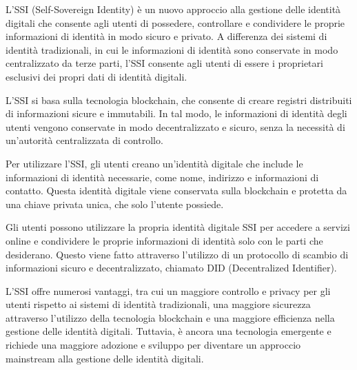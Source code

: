 L'SSI (Self-Sovereign Identity) è un nuovo approccio alla gestione delle identità digitali che consente agli utenti di possedere, controllare e condividere le proprie informazioni di identità in modo sicuro e privato. A differenza dei sistemi di identità tradizionali, in cui le informazioni di identità sono conservate in modo centralizzato da terze parti, l'SSI consente agli utenti di essere i proprietari esclusivi dei propri dati di identità digitali.

L'SSI si basa sulla tecnologia blockchain, che consente di creare registri distribuiti di informazioni sicure e immutabili. In tal modo, le informazioni di identità degli utenti vengono conservate in modo decentralizzato e sicuro, senza la necessità di un'autorità centralizzata di controllo.

Per utilizzare l'SSI, gli utenti creano un'identità digitale che include le informazioni di identità necessarie, come nome, indirizzo e informazioni di contatto. Questa identità digitale viene conservata sulla blockchain e protetta da una chiave privata unica, che solo l'utente possiede.

Gli utenti possono utilizzare la propria identità digitale SSI per accedere a servizi online e condividere le proprie informazioni di identità solo con le parti che desiderano. Questo viene fatto attraverso l'utilizzo di un protocollo di scambio di informazioni sicuro e decentralizzato, chiamato DID (Decentralized Identifier).

L'SSI offre numerosi vantaggi, tra cui un maggiore controllo e privacy per gli utenti rispetto ai sistemi di identità tradizionali, una maggiore sicurezza attraverso l'utilizzo della tecnologia blockchain e una maggiore efficienza nella gestione delle identità digitali. Tuttavia, è ancora una tecnologia emergente e richiede una maggiore adozione e sviluppo per diventare un approccio mainstream alla gestione delle identità digitali.
